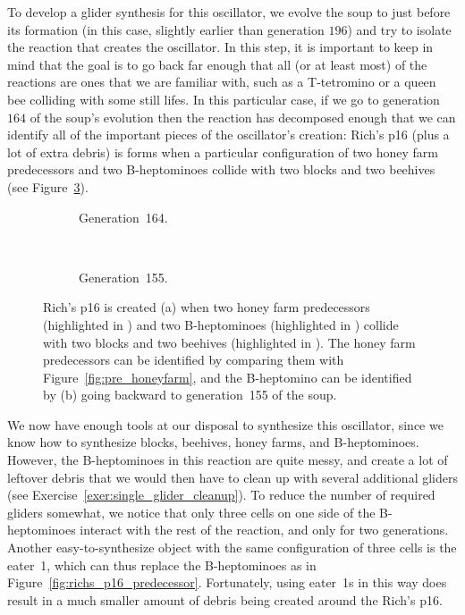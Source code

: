 To develop a glider synthesis for this oscillator, we evolve the soup to just before its formation (in this case, slightly earlier than generation $196$) and try to isolate the reaction that creates the oscillator. In this step, it is important to keep in mind that the goal is to go back far enough that all (or at least most) of the reactions are ones that we are familiar with, such as a T-tetromino or a queen bee colliding with some still lifes. In this particular case, if we go to generation $164$ of the soup's evolution then the reaction has decomposed enough that we can identify all of the important pieces of the oscillator's creation: Rich's p16 (plus a lot of extra debris) is forms when a particular configuration of two honey farm predecessors and two B-heptominoes collide with two blocks and two beehives (see Figure~\ref{fig:richs_p16_soup_detailed}).

\begin{figure}[!htb]
	\centering
	\begin{subfigure}{.48\textwidth}
		\centering{}
		\caption{Generation~164.}\label{fig:richs_p16_soup_164}
	\end{subfigure} \ \ \ \ %
	\begin{subfigure}{.48\textwidth}
		\centering{}
		\caption{Generation~155.}
		\label{fig:richs_p16_soup_155}
	\end{subfigure}
	\caption{Rich's p16 is created (a) when two honey farm predecessors (highlighted in ) and two B-heptominoes (highlighted in ) collide with two blocks and two beehives (highlighted in ). The honey farm predecessors can be identified by comparing them with Figure~\ref{fig:pre_honeyfarm}, and the B-heptomino can be identified by (b) going backward to generation~155 of the soup.}\label{fig:richs_p16_soup_detailed}
\end{figure}

We now have enough tools at our disposal to synthesize this oscillator, since we know how to synthesize blocks, beehives, honey farms, and B-heptominoes. However, the B-heptominoes in this reaction are quite messy, and create a lot of leftover debris that we would then have to clean up with several additional gliders (see Exercise~\ref{exer:single_glider_cleanup}). To reduce the number of required gliders somewhat, we notice that only three cells on one side of the B-heptominoes interact with the rest of the reaction, and only for two generations. Another easy-to-synthesize object with the same configuration of three cells is the eater~1, which can thus replace the B-heptominoes as in Figure~\ref{fig:richs_p16_predecessor}. Fortunately, using eater~1s in this way does result in a much smaller amount of debris being created around the Rich's p16.

